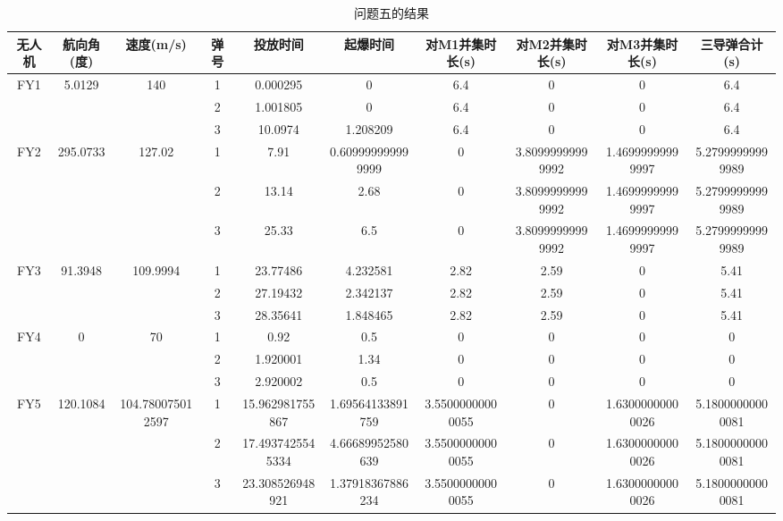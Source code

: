 \documentclass[withoutpreface,bwprint]{cumcmthesis} %
\begin{document}
\begin{table}[h]
    \centering
    \caption{问题五的结果}
    \label{tab:problem5_result}
    \begin{tabular}{cccccccccc}
        \toprule[1.5pt]
        无人机 & 航向角(度) & 速度(m/s) & 弹号 & 投放时间 & 起爆时间 & 对M1并集时长(s) & 对M2并集时长(s) & 对M3并集时长(s) & 三导弹合计(s) \\
        \midrule[1pt]
        \multirow{3}{*}{FY1} & \multirow{3}{*}{5.0129} & \multirow{3}{*}{140} & 1 & 0.000295 & 0 & 6.4 & 0 & 0 & 6.4 \\
        & & & 2 & 1.001805 & 0 & 6.4 & 0 & 0 & 6.4 \\
        & & & 3 & 10.0974 & 1.208209 & 6.4 & 0 & 0 & 6.4 \\
        \midrule[1pt]
        \multirow{3}{*}{FY2} & \multirow{3}{*}{295.0733} & \multirow{3}{*}{127.02} & 1 & 7.91 & 0.609999999999999 & 0 & 3.80999999999992 & 1.46999999999997 & 5.27999999999989 \\
        & & & 2 & 13.14 & 2.68 & 0 & 3.80999999999992 & 1.46999999999997 & 5.27999999999989 \\
        & & & 3 & 25.33 & 6.5 & 0 & 3.80999999999992 & 1.46999999999997 & 5.27999999999989 \\
        \midrule[1pt]
        \multirow{3}{*}{FY3} & \multirow{3}{*}{91.3948} & \multirow{3}{*}{109.9994} & 1 & 23.77486 & 4.232581 & 2.82 & 2.59 & 0 & 5.41 \\
        & & & 2 & 27.19432 & 2.342137 & 2.82 & 2.59 & 0 & 5.41 \\
        & & & 3 & 28.35641 & 1.848465 & 2.82 & 2.59 & 0 & 5.41 \\
        \midrule[1pt]
        \multirow{3}{*}{FY4} & \multirow{3}{*}{0} & \multirow{3}{*}{70} & 1 & 0.92 & 0.5 & 0 & 0 & 0 & 0 \\
        & & & 2 & 1.920001 & 1.34 & 0 & 0 & 0 & 0 \\
        & & & 3 & 2.920002 & 0.5 & 0 & 0 & 0 & 0 \\
        \midrule[1pt]
        \multirow{3}{*}{FY5} & \multirow{3}{*}{120.1084} & \multirow{3}{*}{104.780075012597} & 1 & 15.962981755867 & 1.69564133891759 & 3.55000000000055 & 0 & 1.63000000000026 & 5.18000000000081 \\
        & & & 2 & 17.4937425545334 & 4.66689952580639 & 3.55000000000055 & 0 & 1.63000000000026 & 5.18000000000081 \\
        & & & 3 & 23.308526948921 & 1.37918367886234 & 3.55000000000055 & 0 & 1.63000000000026 & 5.18000000000081 \\
        \bottomrule[1.5pt]
    \end{tabular}
\end{table}
\end{document}
